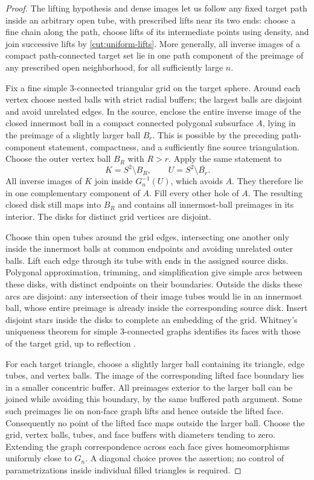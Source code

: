 \begin{proof}
The lifting hypothesis and dense images let us follow any fixed target
path inside an arbitrary open tube, with prescribed lifts near its two
ends: choose a fine chain along the path, choose lifts of its intermediate
points using density, and join successive lifts by
\eqref{cut:uniform-lifts}.  More generally, all inverse images of a compact
path-connected target set lie in one path component of the preimage of
any prescribed open neighborhood, for all sufficiently large $n$.

Fix a fine simple 3-connected triangular grid on the target sphere.
Around each vertex choose nested balls with strict radial buffers; the
largest balls are disjoint and avoid unrelated edges.  In the source,
enclose the entire inverse image of the closed innermost ball in a compact
connected polygonal subsurface $A$, lying in the preimage of a slightly
larger ball $B_r$.  This is possible by the preceding path-component
statement, compactness, and a sufficiently fine source triangulation.
Choose the outer vertex ball $B_R$ with $R>r$.  Apply the same statement to
\[
 K=S^2\setminus B_R,\qquad
 U=S^2\setminus\overline{B_r}.
\]
All inverse images of $K$ join inside $G_n^{-1}(U)$, which avoids $A$.
They therefore lie in one complementary component of $A$.  Fill every other
hole of $A$.  The resulting closed disk still maps into $B_R$ and contains
all innermost-ball preimages in its interior.  The disks for distinct grid
vertices are disjoint.

Choose thin open tubes around the grid edges, intersecting one another
only inside the innermost balls at common endpoints and avoiding unrelated
outer balls.  Lift each edge through its tube with ends in the assigned
source disks.  Polygonal approximation, trimming, and simplification give
simple arcs between these disks, with distinct endpoints on their
boundaries.  Outside the disks these arcs are disjoint: any intersection
of their image tubes would lie in an innermost ball, whose entire preimage
is already inside the corresponding source disk.  Insert disjoint stars
inside the disks to complete an embedding of the grid.  Whitney's
uniqueness theorem for simple 3-connected graphs identifies its faces with
those of the target grid, up to reflection
\citep[Theorem~1.2]{BrinkmannWhitney}.

For each target triangle, choose a slightly larger ball containing its
triangle, edge tubes, and vertex balls.  The image of the corresponding
lifted face boundary lies in a smaller concentric buffer.  All preimages
exterior to the larger ball can be joined while avoiding this boundary,
by the same buffered path argument.  Some such preimages lie on non-face
graph lifts and hence outside the lifted face.  Consequently no point of
the lifted face maps outside the larger ball.  Choose the grid, vertex
balls, tubes, and face buffers with diameters tending to zero.  Extending
the graph correspondence across each face gives homeomorphisms uniformly
close to $G_n$.  A diagonal choice proves the assertion; no control of
parametrizations inside individual filled triangles is required.

\end{proof}

